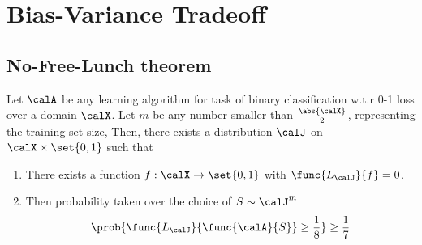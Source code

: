 \chapter{Bias-Variance Tradeoff}
\section{No-Free-Lunch theorem}
\begin{theorem}
    Let \(\calA\) be any learning algorithm for task of binary classification w.t.r 0-1 loss over a domain \(\calX\). Let \(m\) be any number smaller than \(\frac{\abs{\calX}}{2}\), representing the training set size, Then, there exists a distribution \(\calJ\) on \(\calX \times \set{0,1}\) such that 
    \begin{enumerate}
        \item There exists a function \(f: \calX \to \set{0,1}\) with \(\func{L_{\calJ}}{f}  = 0\).
        \item Then probability taken over the choice of \(S \sim \calJ^m\) 
        \begin{equation*}
            \prob{\func{L_{\calJ}}{\func{\calA}{S}} \geq \dfrac{1}{8}} \geq \dfrac{1}{7}
        \end{equation*}
    \end{enumerate}
\end{theorem}

